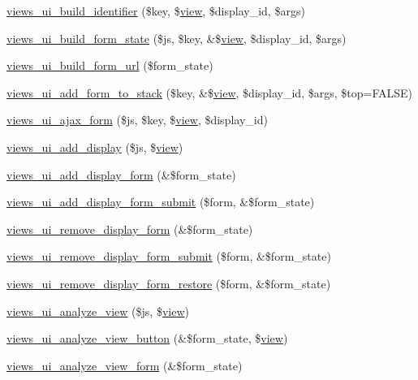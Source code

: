 \begin{CompactItemize}
\item 
\hyperlink{admin_8inc_70be38405376cc28c9f3c53643ae8581}{views\_\-ui\_\-build\_\-identifier} (\$key, \$\hyperlink{classview}{view}, \$display\_\-id, \$args)
\item 
\hyperlink{admin_8inc_fc1eec863da7b425bae3b0509fe17e4d}{views\_\-ui\_\-build\_\-form\_\-state} (\$js, \$key, \&\$\hyperlink{classview}{view}, \$display\_\-id, \$args)
\item 
\hyperlink{admin_8inc_89ecd86607b4c1d1928120aaa1004c0d}{views\_\-ui\_\-build\_\-form\_\-url} (\$form\_\-state)
\item 
\hyperlink{admin_8inc_1bdfd28818165d752db6270d3676fcbb}{views\_\-ui\_\-add\_\-form\_\-to\_\-stack} (\$key, \&\$\hyperlink{classview}{view}, \$display\_\-id, \$args, \$top=FALSE)
\item 
\hyperlink{admin_8inc_ff8d306f0dd773c65acb1f93bdf64b00}{views\_\-ui\_\-ajax\_\-form} (\$js, \$key, \$\hyperlink{classview}{view}, \$display\_\-id)
\item 
\hyperlink{admin_8inc_a873e68cc2b1ed40f04cf5b8653f0973}{views\_\-ui\_\-add\_\-display} (\$js, \$\hyperlink{classview}{view})
\item 
\hyperlink{admin_8inc_7e4eac2a6fd8837f1d0d3c7fdd514d61}{views\_\-ui\_\-add\_\-display\_\-form} (\&\$form\_\-state)
\item 
\hyperlink{admin_8inc_15c3d469bfc61174dcf7846b6b2e5ea8}{views\_\-ui\_\-add\_\-display\_\-form\_\-submit} (\$form, \&\$form\_\-state)
\item 
\hyperlink{admin_8inc_f4e3e3ea2e61d0352567b4fed8bda83f}{views\_\-ui\_\-remove\_\-display\_\-form} (\&\$form\_\-state)
\item 
\hyperlink{admin_8inc_7f6a9599a03beef16e3917fa0a1c275d}{views\_\-ui\_\-remove\_\-display\_\-form\_\-submit} (\$form, \&\$form\_\-state)
\item 
\hyperlink{admin_8inc_85640b9f63281c89ed546c623c22c776}{views\_\-ui\_\-remove\_\-display\_\-form\_\-restore} (\$form, \&\$form\_\-state)
\item 
\hyperlink{admin_8inc_eb3f9989feda5d808cba123a41047634}{views\_\-ui\_\-analyze\_\-view} (\$js, \$\hyperlink{classview}{view})
\item 
\hyperlink{admin_8inc_001b26005a3b21e7ae5df3dc780fa556}{views\_\-ui\_\-analyze\_\-view\_\-button} (\&\$form\_\-state, \$\hyperlink{classview}{view})
\item 
\hyperlink{admin_8inc_09ff526ff78c7d88d2c8f599d3aef176}{views\_\-ui\_\-analyze\_\-view\_\-form} (\&\$form\_\-state)
\item 

\end{CompactItemize}
